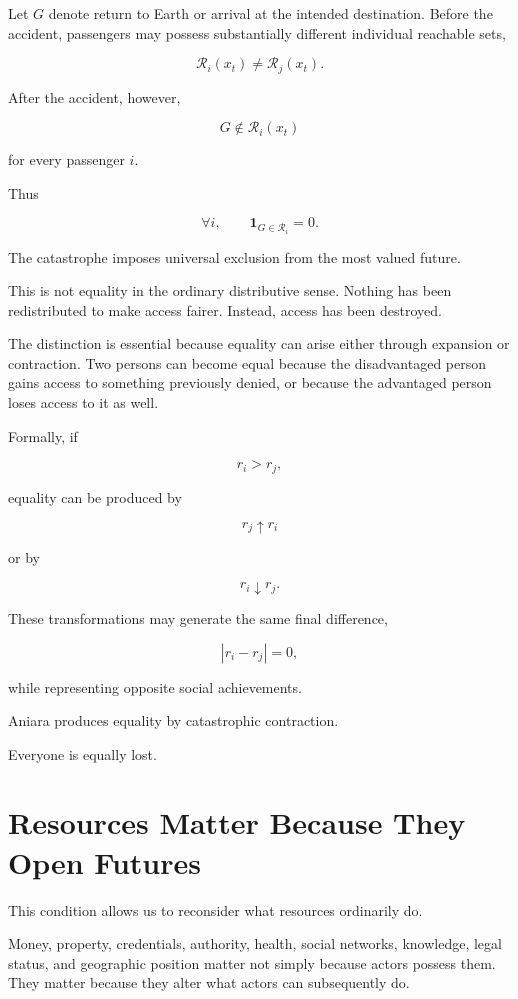 \documentclass[11pt,oneside]{book}
\theoremstyle{definition}
\theoremstyle{remark}
\newcommand{\R}{\mathcal{R}}
\begin{document}
Let \(G\) denote return to Earth or arrival at the intended destination. Before the accident, passengers may possess substantially different individual reachable sets,

\[
\R_i(x_t)\neq\R_j(x_t).
\]

After the accident, however,

\[
G\notin\R_i(x_t)
\]

for every passenger \(i\).

Thus

\[
\forall i,\qquad
\mathbf{1}_{G\in\R_i}=0.
\]

The catastrophe imposes universal exclusion from the most valued future.

This is not equality in the ordinary distributive sense. Nothing has been redistributed to make access fairer. Instead, access has been destroyed.

The distinction is essential because equality can arise either through expansion or contraction. Two persons can become equal because the disadvantaged person gains access to something previously denied, or because the advantaged person loses access to it as well.

Formally, if

\[
r_i>r_j,
\]

equality can be produced by

\[
r_j\uparrow r_i
\]

or by

\[
r_i\downarrow r_j.
\]

These transformations may generate the same final difference,

\[
|r_i-r_j|=0,
\]

while representing opposite social achievements.

Aniara produces equality by catastrophic contraction.

Everyone is equally lost.

\section{Resources Matter Because They Open Futures}

This condition allows us to reconsider what resources ordinarily do.

Money, property, credentials, authority, health, social networks, knowledge, legal status, and geographic position matter not simply because actors possess them. They matter because they alter what actors can subsequently do.
\end{document}
